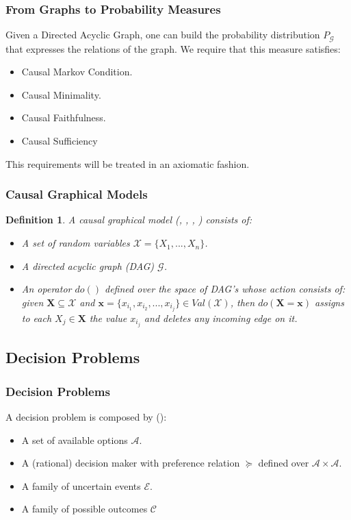 \documentclass{beamer}
\theoremstyle{plain}
\newtheorem{defi}[teo]{Definition}
\begin{document}
		\begin{frame}
		\frametitle{From Graphs to Probability Measures}
		Given a Directed Acyclic Graph, one can build the probability distribution $P_\mathcal{G}$ that expresses the relations of the graph. We require that this measure satisfies:
        \begin{itemize}
        \item Causal Markov Condition.
        \item Causal Minimality.
         \item Causal Faithfulness.
         \item Causal Sufficiency
        \end{itemize}
         This requirements will be treated in an axiomatic fashion.
		\end{frame}
		
	\begin{frame}
	\frametitle{Causal Graphical Models}
	\begin{defi}
	A causal graphical model (\cite{spirtes2000causation}, \cite{pearl2009causality}, \cite{koller2003multi}, \cite{sucar2015probabilistic}) consists of:
	\begin{itemize}
	 \item A set of random variables $\mathcal{X}=\{ X_1,...,X_n \}$.
	 \item A directed acyclic graph (DAG) $\mathcal{G}$.
	 \item An operator $do()$ defined over the space of DAG's whose action consists of: given $\mathbf{X} \subseteq \mathcal{X}$ and $\mathbf{x} = \{ x_{i_1}, x_{i_2}, ... , x_{i_j} \} \in Val(\mathcal{X})$, then $do(\mathbf{X} = \mathbf{x} )$ assigns to each $X_j \in \mathbf{X}$ the value $x_{i_j}$ and deletes any incoming edge on it.
	 \end{itemize}
	 \end{defi}
	 \end{frame}

\subsection{Decision Problems}
	\begin{frame}
	\frametitle{Decision Problems}
	A decision problem is composed by (\cite{bernardo2000bayesian}):
	\begin{itemize}
	\item A set of available options $\mathcal{A}$.
	\item A (rational) decision maker with preference relation $\succeq$ defined over $\mathcal{A} \times \mathcal{A}$.
	\item A family of uncertain events $\mathcal{E}$.
    \item A family of possible outcomes $\mathcal{C}$
	\end{itemize}
	\end{frame}
	
\end{document}
